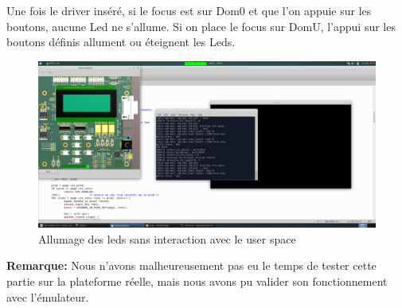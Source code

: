 Une fois le driver inséré, si le focus est sur Dom0 et que l'on appuie sur les boutons, aucune Led ne s'allume. Si on place le focus sur DomU, l'appui sur les boutons définis allument ou éteignent les Leds.
\begin{figure}[H]
	\begin{center}
		\includegraphics[width=17cm]{img/dom06.png}
		\caption{Allumage des leds sans interaction avec le user space}
		\label{dom06}
	\end{center}
\end{figure}
\textbf{Remarque: }Nous n'avons malheureusement pas eu le temps de tester cette partie sur la plateforme réelle, mais nous avons pu valider son fonctionnement avec l'émulateur.